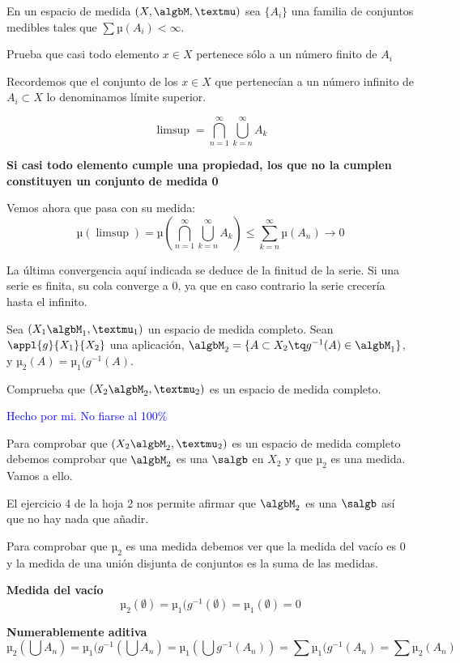 \begin{problem}[10]
En un espacio de medida $(X, \algbM, µ)$ sea $\{A_i\}$ una familia de conjuntos medibles tales que $\sum µ(A_i) < \infty$.

Prueba que casi todo elemento $x \in X$ pertenece sólo a un número finito de $A_i$

\solution

Recordemos que el conjunto de los $x \in X$ que pertenecían a un número infinito de $A_i \subset X$ lo denominamos límite superior.

\[\limsup = \bigcap_{n=1}^{\infty}\bigcup_{k=n}^{\infty} A_k\]

\textbf{Si casi todo elemento cumple una propiedad, los que no la cumplen constituyen un conjunto de medida 0}

Vemos ahora que pasa con su medida:
\[µ(\limsup) = µ(\bigcap_{n=1}^{\infty}\bigcup_{k=n}^{\infty} A_k) \leq \sum_{k=n}^{\infty}µ(A_n) \rightarrow 0\]

La última convergencia aquí indicada se deduce de la finitud de la serie. Si una serie es finita, su cola converge a 0, ya que en caso contrario la serie crecería hasta el infinito.
\end{problem}

\begin{problem}[11]
Sea $(X_1 \algbM_1,µ_1)$ un espacio de medida completo. Sean $\appl{g}{X_1}{X_2}$ una aplicación, $\algbM_2=\{A \subset X_2 \tq g^{-1}(A) \in \algbM_1\}$, y $µ_2(A)=µ_1(g^{-1}(A)$.

Comprueba que $(X_2 \algbM_2,µ_2)$ es un espacio de medida completo.

\solution
\textcolor{blue}{Hecho por mi. No fiarse al 100\%}

Para comprobar que $(X_2 \algbM_2,µ_2)$ es un espacio de medida completo debemos comprobar que $\algbM_2$ es una $\salgb$ en $X_2$ y que $µ_2$ es una medida. Vamos a ello.

El ejercicio 4 de la hoja 2 nos permite afirmar que $\algbM_2$ es una $\salgb$ así que no hay nada que añadir.

Para comprobar que $µ_2$ es una medida debemos ver que la medida del vacío es 0 y la medida de una unión disjunta de conjuntos es la suma de las medidas.

\textbf{Medida del vacío}
\[µ_2(\emptyset) = µ_1(g^{-1}(\emptyset) = µ_1(\emptyset) = 0\]

\textbf{Numerablemente aditiva}
\[µ_2(\bigcup A_n) =  µ_1(g^{-1}(\bigcup A_n) = µ_1(\bigcup g^{-1}(A_n)) = \sum µ_1(g^{-1}(A_n) = \sum µ_2(A_n)\]
\end{problem}

